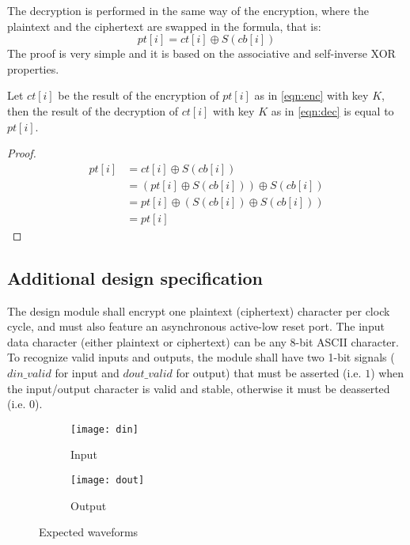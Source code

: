 The decryption is performed in the same way of the encryption, where the plaintext and the ciphertext are swapped in the formula, that is:
\begin{equation}
    \label{eqn:dec}
    pt[i] = ct[i] \oplus S(cb[i])
\end{equation}
The proof is very simple and it is based on the associative and self-inverse XOR properties.

\begin{theorem}
    \label{thm:enc_inv_dec}
    Let $ct[i]$ be the result of the encryption of $pt[i]$ as in \cref{eqn:enc} with key $K$, then the result of the decryption of $ct[i]$ with key $K$ as in \cref{eqn:dec} is equal to $pt[i]$.
\end{theorem}

\begin{proof}
    \begin{align*}
        pt[i] & = ct[i] \oplus S(cb[i])                                \\
              & = \left(pt[i] \oplus S(cb[i]) \right) \oplus S(cb[i])  \\
              & = pt[i] \oplus \left(S(cb[i])  \oplus S(cb[i]) \right) \\
              & = pt[i]
    \end{align*}
\end{proof}

\subsection{Additional design specification}
The design module shall encrypt one plaintext (ciphertext) character per clock cycle, and must also feature an asynchronous active-low reset port.
The input data character (either plaintext or ciphertext) can be any 8-bit ASCII character.
To recognize valid inputs and outputs, the module shall have two 1-bit signals ($din\_valid$ for input and $dout\_valid$ for output) that must be asserted (i.e. $1$) when the input/output character is valid and stable, otherwise it must be deasserted (i.e. $0$).

\begin{figure}
    \centering
    \begin{subfigure}{.95\textwidth}
        \centering
        \texttt{[image: din]}
        \caption{Input}
        \label{fig:input_expected_waveform}
        \vspace*{.6cm}
    \end{subfigure}
    \begin{subfigure}{.95\textwidth}
        \centering
        \texttt{[image: dout]}
        \caption{Output}
        \label{fig:output_expected_waveform}
    \end{subfigure}
    \caption{Expected waveforms}
    \label{fig:expected_waveforms}
\end{figure}